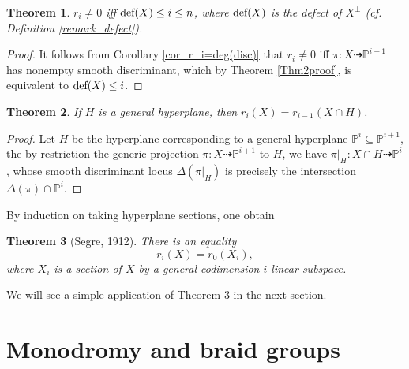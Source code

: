 \documentclass[12pt]{amsart}
\newcommand{\ddef}{\textup{def}}
\newtheorem{theorem}{Theorem}[section]
\begin{document}
\begin{theorem}\cite{HK85}
    $r_i\neq 0$ iff $\ddef(X)\le i\le n$, where $\ddef(X)$ is the defect of $X^{\perp}$ (cf. Definition \ref{remark_defect}).
\end{theorem}
\begin{proof}
It follows from Corollary \ref{cor_r_i=deg(disc)} that $r_i\neq 0$ iff $\pi:X\dashrightarrow \mathbb P^{i+1}$ has nonempty smooth discriminant, which by Theorem \ref{Thm2proof}, is equivalent to $\ddef(X)\le i$.
\end{proof}

\begin{theorem}\cite{Pie78}
    If $H$ is a general hyperplane, then $r_i(X)=r_{i-1}(X\cap H)$.
\end{theorem}
\begin{proof}
Let $H$ be the hyperplane corresponding to a general hyperplane $\mathbb P^i\subseteq \mathbb P^{i+1}$, the by restriction the generic projection $\pi: X\dashrightarrow \mathbb P^{i+1}$ to $H$, we have  $\pi|_H:X\cap H\dashrightarrow \mathbb P^{i}$, whose smooth discriminant locus $\Delta(\pi|_H)$ is precisely the intersection $\Delta(\pi)\cap \mathbb P^i$.
\end{proof}
By induction on taking hyperplane sections, one obtain
\begin{theorem}[Segre, 1912] \cite[p.190]{Kle86}\label{thm_Segre12} There is an equality
    $$r_i(X)=r_0(X_i),$$
where $X_i$ is a section of $X$ by a general codimension $i$ linear subspace.
\end{theorem}
We will see a simple application of Theorem \ref{thm_Segre12} in the next section.


\section{Monodromy and braid groups}\label{sec_braidgroup}
\end{document}
